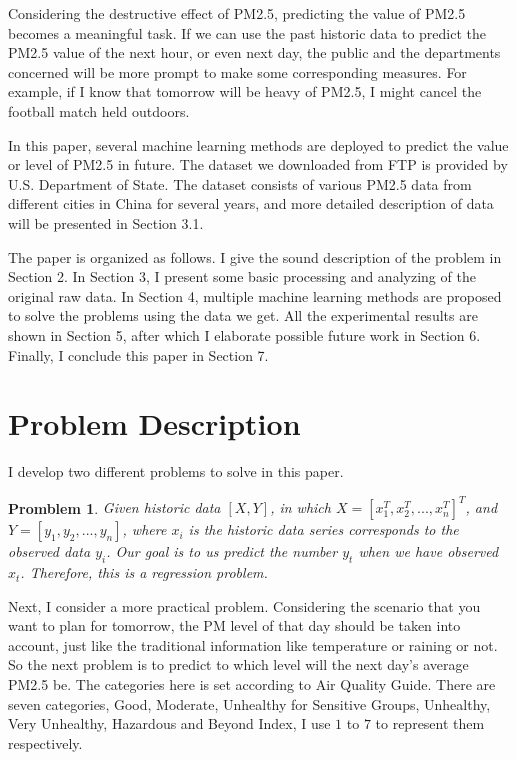 \documentclass{sig-alternate}
\begin{document}
Considering the destructive effect of PM2.5, predicting the value of PM2.5 becomes a meaningful task. If we can use the past historic data to predict the PM2.5 value of the next hour, or even next day, the public and the departments concerned will be more prompt to make some corresponding measures. For example, if I know that tomorrow will be heavy of PM2.5, I might cancel the football match held outdoors.

In this paper, several machine learning methods are deployed to predict the value or level of PM2.5 in future. The dataset we downloaded from FTP is provided by U.S. Department of State\cite{data}. The dataset consists of various PM2.5 data from different cities in China for several years, and more detailed description of data will be presented in Section 3.1.

The paper is organized as follows. I give the sound description of the problem in Section 2. In Section 3, I present some basic processing and analyzing of the original raw data. In Section 4, multiple machine learning methods are proposed to solve the problems using the data we get. All the experimental results are shown in Section 5, after which I elaborate possible future work in Section 6. Finally, I conclude this paper in Section 7.



\section{Problem Description}
I develop two different problems to solve in this paper.
\newtheorem{theorem}{Promblem}
\begin{theorem}
Given historic data $[X,Y]$, in which $X=[x_{1}^{T},x_{2}^{T},...,x_{n}^{T}]^{T}$, and $Y=[y_1, y_2, ..., y_n]$, where $x_i$ is the historic data series corresponds to the observed data $y_i$. Our goal is to us predict the number $y_t$ when we have observed $x_t$. Therefore, this is a regression problem.
\end{theorem}

Next, I consider a more practical problem. Considering the scenario that you want to plan for tomorrow, the PM level of that day should be taken into account, just like the traditional information like temperature or raining or not. So the next problem is to predict to which level will the next day's average PM2.5 be. The categories here is set according to Air Quality Guide.\cite{level} There are seven categories, Good, Moderate, Unhealthy for Sensitive Groups, Unhealthy, Very Unhealthy, Hazardous and Beyond Index, I use $1$ to $7$ to represent them respectively.
\end{document}
